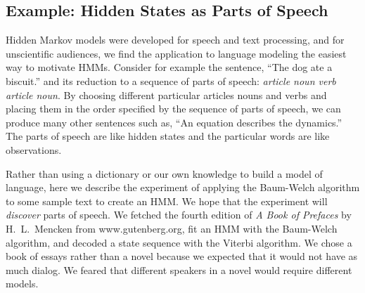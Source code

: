 \subsection{Example: Hidden States as Parts of Speech}
\label{sec:POSpeech}

Hidden Markov models were developed for speech and text processing,
and for unscientific audiences, we find the application to language
modeling the easiest way to motivate HMMs.  Consider for example the
sentence, ``The dog ate a biscuit.'' and its reduction to a sequence
of parts of speech: \emph{article noun verb article noun}.  By
choosing different particular articles nouns and verbs and placing
them in the order specified by the sequence of parts of speech, we can
produce many other sentences such as, ``An equation describes the
dynamics.''  The parts of speech are like hidden states and the
particular words are like observations.

Rather than using a dictionary or our own knowledge to build a model
of language, here we describe the experiment of applying the
Baum-Welch algorithm to some sample text to create an HMM.  We hope
that the experiment will \emph{discover} parts of speech.  We fetched
the fourth edition of \emph{A Book of Prefaces} by H.~L.~Mencken from
www.gutenberg.org, fit an HMM with the Baum-Welch algorithm, and
decoded a state sequence with the Viterbi algorithm.  We chose a book
of essays rather than a novel because we expected that it would not
have as much dialog.  We feared that different speakers in a novel
would require different models.

